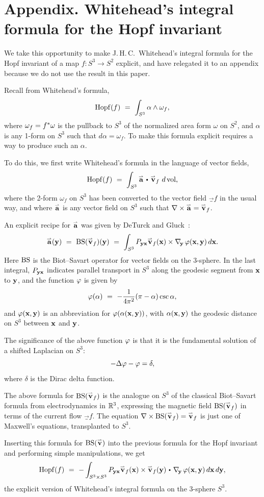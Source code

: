 \appendix

\section*{Appendix.  Whitehead's integral formula for the Hopf invariant}

We take this opportunity to make J.\,H.\,C.~Whitehead's integral formula for the Hopf invariant of a map $f\colon S^3\to S^2$ explicit, and have relegated it to an appendix because we do not use the result in this paper.

Recall from  Whitehead's formula, 
$$
\Hopf(f) \ = \ \int_{S^3}\alpha\wedge\omega_f,
$$
where $\omega_f=f^*\omega$ is the pullback to $S^3$ of the normalized area form $\omega$ on $S^2$, and $\alpha$ is any 1-form on $S^3$ such that $d\alpha=\omega_f$. To make this formula explicit requires a way to produce such an $\alpha$. 

To do this, we first write Whitehead's formula in the language of vector fields,
$$
\Hopf(f) \ = \ \int_{S^3}\veca\dtw\vec_f\ d\vol,
$$
where the 2-form $\omega_f$ on $S^3$ has been converted to the vector field $\vec_f$ in the usual way, and where $\overset{\scriptstyle{}_\rightharpoonup}{\textup{\bf a}}$ is any vector field on $S^3$ such that $\nabla\times\overset{\scriptstyle{}_\rightharpoonup}{\textup{\bf a}}=\overset{\scriptstyle{}_\rightharpoonup}{\textup{\bf v}}_f$.

An explicit recipe for $\overset{\scriptstyle{}_\rightharpoonup}{\textup{\bf a}}$ was given by DeTurck and Gluck~\cite{DeTurckGluck}:
$$
\veca(\y) \ = \ \BS(\vec_f)(\y) \ = \ \int_{S^3}P_{\y\x}\vec_f(\x)\times\nabla_{\!\y}\,\ph(\x,\y)\,d\x.
$$
Here $\mathop{\rm BS}\nolimits$ is the Biot--Savart operator for vector fields on the $3$-sphere.  In the last integral, $P_{\textup{\bf y}\textup{\bf x}}$ indicates parallel transport in $S^3$ along the geodesic segment from $\textup{\bf x}$ to $\textup{\bf y}$, and the function $\varphi$ is given by
$$
\varphi(\alpha) \ = \ -{1\over 4\pi^2}(\pi-\alpha)\csc\alpha,
$$
and $\varphi(\textup{\bf x},\textup{\bf y})$ is an abbreviation for $\varphi(\alpha(\textup{\bf x},\textup{\bf y}))$, with
$\alpha(\textup{\bf x},\textup{\bf y})$ the geodesic distance on $S^3$ between $\textup{\bf x}$ and $\textup{\bf y}$. 

The significance of the above function $\varphi$ is that it is the fundamental solution of a shifted 
Laplacian on $S^3$: 
$$-\Delta\varphi-\varphi=\delta,$$
where $\delta$ is the Dirac delta function. 

The above formula for $\mathop{\rm BS}\nolimits(\overset{\scriptstyle{}_\rightharpoonup}{\textup{\bf v}}_f)$ is the analogue on $S^3$ of the classical Biot--Savart formula from 
electrodynamics in $\mathbb R^3$, expressing the magnetic field $\mathop{\rm BS}\nolimits(\overset{\scriptstyle{}_\rightharpoonup}{\textup{\bf v}}_f)$ in terms of the current 
flow $\vec_f$. The equation $\nabla\times\mathop{\rm BS}\nolimits(\overset{\scriptstyle{}_\rightharpoonup}{\textup{\bf v}}_f)=\overset{\scriptstyle{}_\rightharpoonup}{\textup{\bf v}}_f$ is just one of Maxwell's 
equations, transplanted to $S^3$.

Inserting this formula for $\mathop{\rm BS}\nolimits(\overset{\scriptstyle{}_\rightharpoonup}{\textup{\bf v}})$ into the previous formula for the 
Hopf invariant and performing simple manipulations, we get
$$
\Hopf(f) \ = \ -\int_{S^3\times S^3} P_{\y\x}\vec_f(\x)\times\vec_f(\y)\dtw
\nabla_{\!\y}\,\ph(\x,\y)\,d\x\,d\y,
$$
the explicit version of Whitehead's integral formula on the 3-sphere $S^3$.



